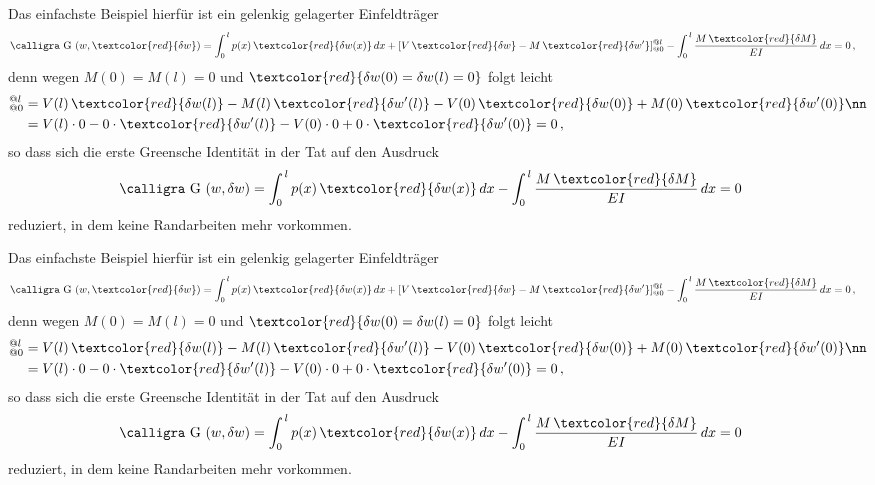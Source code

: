 Das einfachste Beispiel hierf\"{u}r ist ein gelenkig gelagerter Einfeldtr\"{a}ger
\begin{align}
\text{\normalfont\calligra G\,\,}(w, \textcolor{red}{\delta w}) &= \int_0^{\,l} p(x)\,\textcolor{red}{\delta w(x)}\,dx + [V\,\textcolor{red}{\delta w} - M\,\textcolor{red}{\delta w'}]_{@0}^{@l} - \int_0^{\,l} \frac{M\,\textcolor{red}{\delta M}}{EI}\,dx = 0\,,
\end{align}
denn wegen $M(0) = M(l) = 0 $ und $\textcolor{red}{\delta w(0) = \delta w(l) = 0}$ folgt leicht
\begin{align}
[V\,\textcolor{red}{\delta w} - M\,\textcolor{red}{\delta w'}]_{@0}^{@l} &= V(l)\,\textcolor{red}{\delta w(l)} - M(l)\,\textcolor{red}{\delta w'(l)} - V(0)\,\textcolor{red}{\delta w(0)} + M(0)\,\textcolor{red}{\delta w'(0)}\nn \\
&= V(l) \cdot 0 - 0\cdot \textcolor{red}{\delta w'(l)} - V(0) \cdot 0 + 0 \cdot \textcolor{red}{\delta w'(0)} = 0\,,
\end{align}
so dass sich die erste Greensche Identit\"{a}t in der Tat auf den Ausdruck
\begin{align}
\text{\normalfont\calligra G\,\,}(w, \delta w) &= \int_0^{\,l} p(x)\,\textcolor{red}{\delta w(x)}\,dx  - \int_0^{\,l} \frac{M\,\textcolor{red}{\delta M}}{EI}\,dx = 0
\end{align}
reduziert, in dem keine Randarbeiten mehr vorkommen.



Das einfachste Beispiel hierf\"{u}r ist ein gelenkig gelagerter Einfeldtr\"{a}ger
\begin{align}
\text{\normalfont\calligra G\,\,}(w, \textcolor{red}{\delta w}) &= \int_0^{\,l} p(x)\,\textcolor{red}{\delta w(x)}\,dx + [V\,\textcolor{red}{\delta w} - M\,\textcolor{red}{\delta w'}]_{@0}^{@l} - \int_0^{\,l} \frac{M\,\textcolor{red}{\delta M}}{EI}\,dx = 0\,,
\end{align}
denn wegen $M(0) = M(l) = 0 $ und $\textcolor{red}{\delta w(0) = \delta w(l) = 0}$ folgt leicht
\begin{align}
[V\,\textcolor{red}{\delta w} - M\,\textcolor{red}{\delta w'}]_{@0}^{@l} &= V(l)\,\textcolor{red}{\delta w(l)} - M(l)\,\textcolor{red}{\delta w'(l)} - V(0)\,\textcolor{red}{\delta w(0)} + M(0)\,\textcolor{red}{\delta w'(0)}\nn \\
&= V(l) \cdot 0 - 0\cdot \textcolor{red}{\delta w'(l)} - V(0) \cdot 0 + 0 \cdot \textcolor{red}{\delta w'(0)} = 0\,,
\end{align}
so dass sich die erste Greensche Identit\"{a}t in der Tat auf den Ausdruck
\begin{align}
\text{\normalfont\calligra G\,\,}(w, \delta w) &= \int_0^{\,l} p(x)\,\textcolor{red}{\delta w(x)}\,dx  - \int_0^{\,l} \frac{M\,\textcolor{red}{\delta M}}{EI}\,dx = 0
\end{align}
reduziert, in dem keine Randarbeiten mehr vorkommen.



